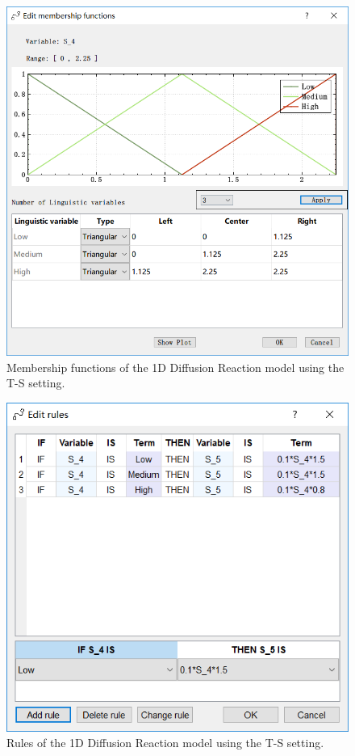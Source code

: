 \documentclass[journal,a4paper,onecolumn]{article}
\begin{document}
\begin{figure}[!hbt]
	\begin{center}
		\includegraphics[width=\columnwidth]{fig34}
		\caption{Membership functions of the 1D Diffusion Reaction model using the T-S setting.}
		\label{fig:Membership functions of 1D Diffusion Reaction using T-S.}
	\end{center}
\end{figure}

\begin{figure}[!hbt]
	\begin{center}
		\includegraphics[width=\columnwidth]{fig35}
		\caption{Rules of the 1D Diffusion Reaction model using the T-S setting.}
		\label{fig:Rules of 1D Diffusion Reaction using T-S.}
	\end{center}
\end{figure}
\end{document}
